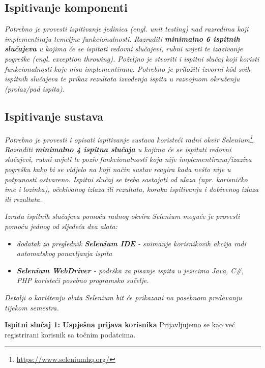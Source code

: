 			
			\subsection{Ispitivanje komponenti}
			\textit{Potrebno je provesti ispitivanje jedinica (engl. unit testing) nad razredima koji implementiraju temeljne funkcionalnosti. Razraditi \textbf{minimalno 6 ispitnih slučajeva} u kojima će se ispitati redovni slučajevi, rubni uvjeti te izazivanje pogreške (engl. exception throwing). Poželjno je stvoriti i ispitni slučaj koji koristi funkcionalnosti koje nisu implementirane. Potrebno je priložiti izvorni kôd svih ispitnih slučajeva te prikaz rezultata izvođenja ispita u razvojnom okruženju (prolaz/pad ispita). }
			
			
			
			\subsection{Ispitivanje sustava}
			
			 \textit{Potrebno je provesti i opisati ispitivanje sustava koristeći radni okvir Selenium\footnote{\url{https://www.seleniumhq.org/}}. Razraditi \textbf{minimalno 4 ispitna slučaja} u kojima će se ispitati redovni slučajevi, rubni uvjeti te poziv funkcionalnosti koja nije implementirana/izaziva pogrešku kako bi se vidjelo na koji način sustav reagira kada nešto nije u potpunosti ostvareno. Ispitni slučaj se treba sastojati od ulaza (npr. korisničko ime i lozinka), očekivanog izlaza ili rezultata, koraka ispitivanja i dobivenog izlaza ili rezultata.\\ }
			 
			 \textit{Izradu ispitnih slučajeva pomoću radnog okvira Selenium moguće je provesti pomoću jednog od sljedeća dva alata:}
			 \begin{itemize}
			 	\item \textit{dodatak za preglednik \textbf{Selenium IDE} - snimanje korisnikovih akcija radi automatskog ponavljanja ispita	}
			 	\item \textit{\textbf{Selenium WebDriver} - podrška za pisanje ispita u jezicima Java, C\#, PHP koristeći posebno programsko sučelje.}
			 \end{itemize}
		 	\textit{Detalji o korištenju alata Selenium bit će prikazani na posebnom predavanju tijekom semestra.}


    \textbf{Ispitni slučaj 1: Uspješna prijava korisnika}
    Prijavljujemo se kao već registrirani korisnik sa točnim podatcima. 
    
